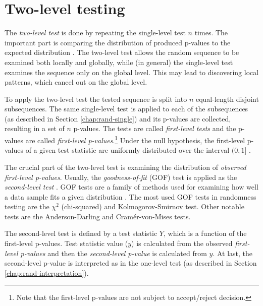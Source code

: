 \documentclass[
  digital,     %
  oneside,     %
  nosansbold,  %
  nocolorbold, %
  nolof,         %
  nolot,         %
]{fithesis4}
\begin{document}
\pagebreak
\section{Two-level testing} \label{chap:rand-two_level}

The \emph{two-level test} is done by repeating the single-level test $n$ times. The important part is comparing the distribution of produced p-values to the expected distribution \cite[p.~7]{tu01_paper}. The two-level test allows the random sequence to be examined both locally and globally, while (in general) the single-level test examines the sequence only on the global level. This may lead to discovering local patterns, which cancel out on the global level. 

To apply the two-level test the tested sequence is split into $n$ equal-length disjoint subsequences. The same single-level test is applied to each of the subsequences (as described in Section \ref{chap:rand-single}) and its p-values are collected, resulting in a set of $n$ p-values. The tests are called \emph{first-level tests} and the p-values are called \emph{first-level p-values}.\footnote{Note that the first-level p-values are not subject to accept/reject decision.} Under the null hypothesis, the first-level p-values of a given test statistic are uniformly distributed over the interval $(0,1]$ \cite[p. 14]{bad_day}.

The crucial part of the two-level test is examining the distribution of \emph{observed first-level p-values}. Usually, the \emph{goodness-of-fit} (GOF) test is applied as the \emph{second-level test} \cite[p. 6]{tu01_paper}. GOF tests are a family of methods used for examining how well a data sample fits a given distribution \cite[p. 1]{GOF-techniques}. The most used GOF tests in randomness testing are the $\chi^2$ (chi-squared) and Kolmogorov-Smirnov test. Other notable tests are the Anderson-Darling and Cramér-von-Mises tests. %

The second-level test is defined by a test statistic $Y$, which is a function of the first-level p-values. Test statistic value ($y$) is calculated from the observed \emph{first-level p-values} and then the \emph{second-level p-value} is calculated from $y$. At last, the second-level p-value is interpreted as in the one-level test (as described in Section \ref{chap:rand-interpretation}). 
\end{document}
